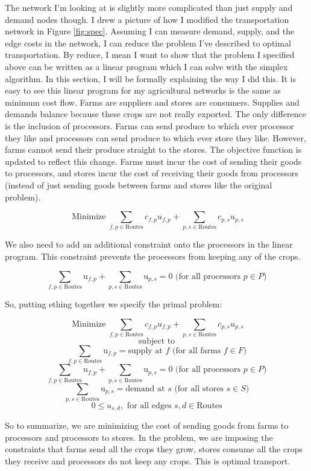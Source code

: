 \documentclass{report}
\begin{document}

The network I'm looking at is slightly more complicated than just supply and demand nodes though. I drew a picture of how I modified the transportation network in Figure \ref{fig:spec}. Assuming I can measure demand, supply, and the edge costs in the network, I can reduce the problem I've described to optimal transportation. By reduce, I mean I want to show that the problem I specified above can be  written as a linear program which I can solve with the simplex algorithm. In this section, I will be formally explaining the way I did this. It is easy to see this linear program for my agricultural networks is  the same as minimum cost flow. Farms are suppliers and stores are consumers. Supplies and demands balance because these crops are not really exported. The only difference is the inclusion of processors. Farms can send produce to which ever processor they like and processors can send produce to which ever store they like. However, farms cannot send their produce straight to the stores. The objective function is updated to reflect this change. Farms must incur the cost of sending their goods to processors, and stores incur the cost of receiving their goods from processors (instead of just sending goods between farms and stores like the original problem).

$$\operatorname{Minimize} \sum_{f,p \in \text{Routes}} c_{f,p} u_{f,p} + \sum_{p,s \in \text{Routes}} c_{p,s} u_{p,s}$$

We also need to add an additional constraint onto the processors in the linear program. This constraint prevents the processors from keeping any of the crops.

$$\sum_{f,p \in \text{Routes}} \text{u}_{f,p} + \sum_{p,s \in \text{Routes}} \text{u}_{p,s} = 0 \text{ (for all processors } p \in P)$$

So, putting ething together we specify the primal problem:

$$\operatorname{Minimize} \sum_{f,p \in \text{Routes}} c_{f,p} u_{f,p} + \sum_{p,s \in \text{Routes}} c_{p,s} u_{p,s}$$
$$\text{subject to}$$
$$\sum_{f,p \in \text{Routes}} \text{u}_{f,p}= \text{supply at } f \text{ (for all farms } f \in F)$$
$$\sum_{f,p \in \text{Routes}} \text{u}_{f,p} + \sum_{p,s \in \text{Routes}} \text{u}_{p,s} = 0 \text{ (for all processors } p \in P)$$
$$\sum_{p,s \in \text{Routes}} \text{u}_{p,s}= \text{demand at } s \text{ (for all stores } s \in S)$$
$$0 \leq u_{s,d}, \text{ for all edges } s,d \in \text{Routes}$$

So to summarize, we are minimizing the cost of sending goods from farms to processors and processors to stores. In the problem, we are imposing the constraints that farms send all the crops they grow, stores consume all the crops they receive and processors do not keep any crops. This is  optimal transport.
\end{document}
